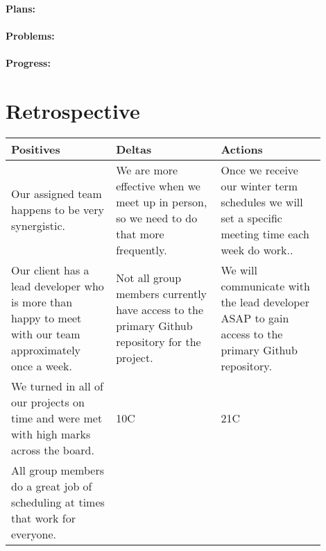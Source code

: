 \documentclass[onecolumn, draftclsnofoot,10pt, compsoc]{article}
\begin{document}
		    \paragraph{Plans:} \hfill \break
		
		    \paragraph{Problems:} \hfill \break
		
		    \paragraph{Progress:} \hfill \break
		
		
\section{Retrospective}
\begin{center}
    \begin{tabular}{ |  p{0.3\linewidth} | p{0.3\linewidth} |  p{0.3\linewidth} |}
    \hline
    Positives & Deltas & Actions \\ \hline
    Our assigned team happens to be very synergistic. & We are more effective when we meet up in person, so we need to do that more frequently.
    & Once we receive our winter term schedules we will set a specific meeting time each week do work..  \\ \hline
    Our client has a lead developer who is more than happy to meet with our team approximately once a week. &
    Not all group members currently have access to the primary Github repository for the project. &
    We will communicate with the lead developer ASAP to gain access to the primary Github repository.  \\ \hline
    We turned in all of our projects on time and were met with high marks across the board. & 10C & 21C\\ \hline
    All group members do a great job of scheduling at times that work for everyone. &  & \\ \hline
    \end{tabular}
\end{center}
\end{document}
